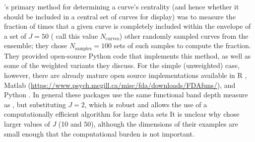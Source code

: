 \documentclass[12pt]{article}
\newcommand{\comment}{\showcomment}
\newcommand{\showcomment}[3]{\textcolor{#1}{\textbf{[#2: }\textsl{#3}\textbf{]}}}
\newcommand{\ncurve}{\ensuremath{N_{\textrm{curves}}}\xspace}
\newcommand{\nsample}{\ensuremath{N_{\textrm{samples}}}\xspace}
\newcommand{\ali}[1]{\comment{magenta}{Ali}{#1}}
\newcommand{\bmb}[1]{\comment{red}{BMB}{#1}}
\theoremstyle{definition} %
\begin{document}
\cite{juul2021fixed}'s primary method for determining a curve's centrality (and hence whether it should be included in a central set of curves for display) was to measure the fraction of times that a given curve is completely included within the envelope of a set of $J=50$ (\cite{juul2021fixed} call this value \ncurve) other randomly sampled curves from the ensemble; they chose $\nsample=100$ sets of such samples to compute the fraction. They provided open-source Python code that implements this method, as well as some of the weighted variants they discuss. For the simple (unweighted) case, however, there are already mature open source implementations available in R \citep{fda_pkg,roahd}, Matlab (\url{https://www.psych.mcgill.ca/misc/fda/downloads/FDAfuns/}), and Python \citep{seabold2010statsmodels}. In general these packages use the same functional band depth measure as \cite{juul2021fixed}, but substituting $J=2$, which is robust \citep{lopez2009concept} and allows the use of a computationally efficient algorithm for large data sets \citep{sun2012exact}
It is unclear why \cite{juul2021fixed} chose larger values of $J$ (10 and 50), although the dimensions of their examples are small enough that the computational burden is not important.

\end{document}
